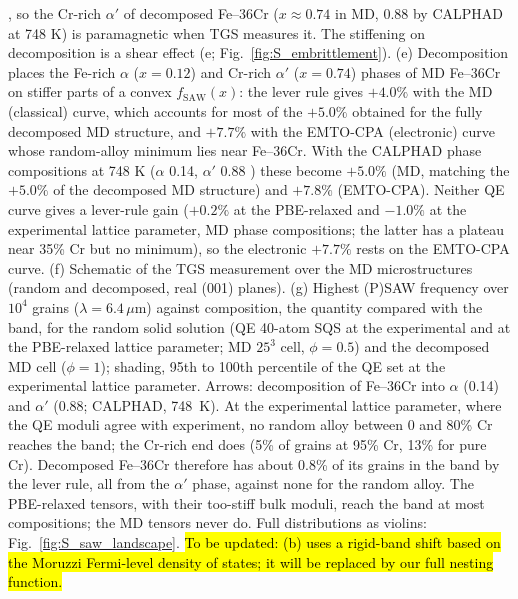 \documentclass[final,3p,times]{elsarticle}
\DeclareRobustCommand{\upd}[1]{{\sethlcolor{yellow}\hl{To be updated: #1}}}
\begin{document}
\cite{xiong2011improved}, so the Cr-rich $\alpha'$ of decomposed Fe--36Cr ($x\approx0.74$ in MD, 0.88 by CALPHAD at 748 K) is paramagnetic when TGS measures it. The stiffening on decomposition is a shear effect (e; Fig.~\ref{fig:S_embrittlement}). (e) Decomposition places the Fe-rich $\alpha$ ($x=0.12$) and Cr-rich $\alpha'$ ($x=0.74$) phases of MD Fe--36Cr on stiffer parts of a convex $f_{\mathrm{SAW}}(x)$: the lever rule gives $+4.0\%$ with the MD (classical) curve, which accounts for most of the $+5.0\%$ obtained for the fully decomposed MD structure, and $+7.7\%$ with the EMTO-CPA (electronic) curve whose random-alloy minimum lies near Fe--36Cr. With the CALPHAD phase compositions at 748 K ($\alpha$ 0.14, $\alpha'$ 0.88 \cite{xiong2011improved}) these become $+5.0\%$ (MD, matching the $+5.0\%$ of the decomposed MD structure) and $+7.8\%$ (EMTO-CPA). Neither QE curve gives a lever-rule gain ($+0.2\%$ at the PBE-relaxed and $-1.0\%$ at the experimental lattice parameter, MD phase compositions; the latter has a plateau near 35\% Cr but no minimum), so the electronic $+7.7\%$ rests on the EMTO-CPA curve. (f) Schematic of the TGS measurement over the MD microstructures (random and decomposed, real (001) planes). (g) Highest (P)SAW frequency over $10^4$ grains ($\lambda=6.4\,\mu$m) against composition, the quantity compared with the band, for the random solid solution (QE 40-atom SQS at the experimental and at the PBE-relaxed lattice parameter; MD $25^3$ cell, $\phi=0.5$) and the decomposed MD cell ($\phi=1$); shading, 95th to 100th percentile of the QE set at the experimental lattice parameter. Arrows: decomposition of Fe--36Cr into $\alpha$ (0.14) and $\alpha'$ (0.88; CALPHAD, 748~K). At the experimental lattice parameter, where the QE moduli agree with experiment, no random alloy between 0 and 80\% Cr reaches the band; the Cr-rich end does (5\% of grains at 95\% Cr, 13\% for pure Cr). Decomposed Fe--36Cr therefore has about 0.8\% of its grains in the band by the lever rule, all from the $\alpha'$ phase, against none for the random alloy. The PBE-relaxed tensors, with their too-stiff bulk moduli, reach the band at most compositions; the MD tensors never do. Full distributions as violins: Fig.~\ref{fig:S_saw_landscape}. \upd{(b) uses a rigid-band shift based on the Moruzzi Fermi-level density of states; it will be replaced by our full nesting function.}
\clearpage
\end{document}
